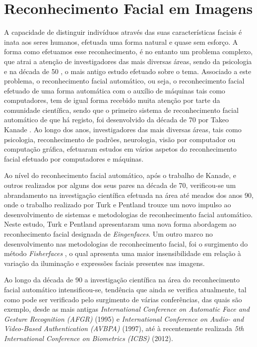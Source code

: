 \chapter{Reconhecimento Facial em Imagens} \label{chap:reco}

A capacidade de distinguir indivíduos através das suas características faciais é inata aos seres humanos, efetuada uma forma natural e quase sem esforço. A forma como efetuamos esse reconhecimento, é no entanto um problema complexo, que atrai a atenção de investigadores das mais diversas áreas, sendo da psicologia e na década de 50 \citep{BRUNERJEROMES.TAGIURI1954}, o mais antigo estudo efetuado sobre o tema. Associado a este problema, o reconhecimento facial automático, ou seja, o reconhecimento facial efetuado de uma forma automática com o auxílio de máquinas tais como computadores, tem de igual forma recebido muita atenção por tarte da comunidade científica, sendo que o primeiro sistema de reconhecimento facial automático de que há registo, foi desenvolvido da década de 70 por Takeo Kanade \citep{Kanade1973}. Ao longo dos anos, investigadores das mais diversas áreas, tais como  psicologia, reconhecimento de padrões, neurologia, visão por computador ou computação gráfica, efetuaram estudos em vários aspetos do reconhecimento facial efetuado por computadores e máquinas.

Ao nível do reconhecimento facial automático, após o trabalho de Kanade, e outros realizados por alguns dos seus pares na década de 70, verificou-se um abrandamento na investigação científica efetuada na área até meados dos anos 90, onde o trabalho realizado por Turk e Pentland \citep{Turk1991} trouxe um novo impulso ao desenvolvimento de sistemas e metodologias de reconhecimento facial automático. Neste estudo, Turk e Pentland apresentaram uma nova forma abordagem ao reconhecimento facial designada de \textit{Eingenfaces}. Um outro marco no desenvolvimento nas metodologias de reconhecimento facial, foi o surgimento do método \textit{Fisherfaces} \citep{Belhumeur1997, Zhao1998}, o qual apresenta uma maior insensibilidade em relação à variação da iluminação e expressões faciais presentes nas imagens.

Ao longo da década de 90 a investigação científica na área do reconhecimento facial automático intensificou-se, tendência que ainda se verifica atualmente, tal como pode ser verificado pelo surgimento de várias conferências, das quais são exemplo, desde as mais antigas
\textit{International Conference on Automatic Face and Gesture Recognition (AFGR)} (1995) e \textit{International Conference on Audio- and Video-Based Authentication (AVBPA)} (1997), até à recentemente realizada \textit{5th International Conference on Biometrics (ICBS)} (2012).

